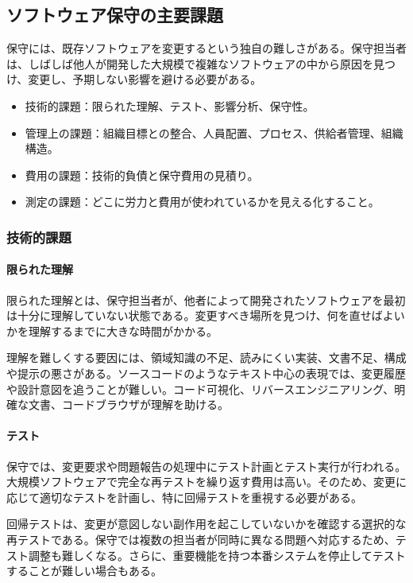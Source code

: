 \subsection{ソフトウェア保守の主要課題}
保守には、既存ソフトウェアを変更するという独自の難しさがある。保守担当者は、しばしば他人が開発した大規模で複雑なソフトウェアの中から原因を見つけ、変更し、予期しない影響を避ける必要がある。\par
\begin{itemize}
\item 技術的課題：限られた理解、テスト、影響分析、保守性。
\item 管理上の課題：組織目標との整合、人員配置、プロセス、供給者管理、組織構造。
\item 費用の課題：技術的負債と保守費用の見積り。
\item 測定の課題：どこに労力と費用が使われているかを見える化すること。
\end{itemize}
\subsubsection{技術的課題}
\paragraph{限られた理解}
限られた理解とは、保守担当者が、他者によって開発されたソフトウェアを最初は十分に理解していない状態である。変更すべき場所を見つけ、何を直せばよいかを理解するまでに大きな時間がかかる。\par
理解を難しくする要因には、領域知識の不足、読みにくい実装、文書不足、構成や提示の悪さがある。ソースコードのようなテキスト中心の表現では、変更履歴や設計意図を追うことが難しい。コード可視化、リバースエンジニアリング、明確な文書、コードブラウザが理解を助ける。\par
\paragraph{テスト}
保守では、変更要求や問題報告の処理中にテスト計画とテスト実行が行われる。大規模ソフトウェアで完全な再テストを繰り返す費用は高い。そのため、変更に応じて適切なテストを計画し、特に回帰テストを重視する必要がある。\par
回帰テストは、変更が意図しない副作用を起こしていないかを確認する選択的な再テストである。保守では複数の担当者が同時に異なる問題へ対応するため、テスト調整も難しくなる。さらに、重要機能を持つ本番システムを停止してテストすることが難しい場合もある。\par
